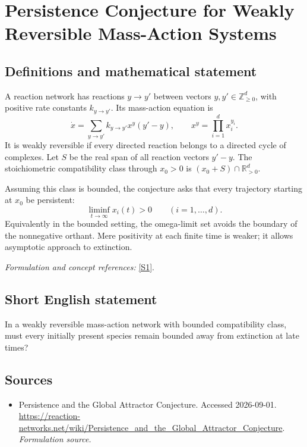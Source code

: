\documentclass[11pt]{article}
\begin{document}
\section*{\texorpdfstring{Persistence Conjecture for Weakly Reversible Mass-Action Systems}{Persistence Conjecture for Weakly Reversible Mass-Action Systems}}\label{30006961}
\subsection{Definitions and mathematical statement}
A reaction network has reactions $y\to y'$ between vectors $y,y'\in{\mathbb{Z}}_{\ge0}^d$, with positive rate constants $k_{y\to y'}$. Its mass-action equation is
\[
 \dot x=\sum_{y\to y'}k_{y\to y'}x^y(y'-y),
 \qquad x^y=\prod_{i=1}^dx_i^{y_i}.
\]
It is weakly reversible if every directed reaction belongs to a directed cycle of complexes. Let $S$ be the real span of all reaction vectors $y'-y$. The stoichiometric compatibility class through $x_0>0$ is $(x_0+S)\cap{\mathbb{R}}_{>0}^d$.

Assuming this class is bounded, the conjecture asks that every trajectory starting at $x_0$ be persistent:
\[
 \liminf_{t\to\infty}x_i(t)>0\qquad(i=1,\ldots,d).
\]
Equivalently in the bounded setting, the omega-limit set avoids the boundary of the nonnegative orthant. Mere positivity at each finite time is weaker; it allows asymptotic approach to extinction.
\par\smallskip\textit{Formulation and concept references:} \href{https://reaction-networks.net/wiki/Persistence_and_the_Global_Attractor_Conjecture}{[S1]}.

\subsection{Short English statement}
In a weakly reversible mass-action network with bounded compatibility class, must every initially present species remain bounded away from extinction at late times?
\subsection{Sources}
\begin{itemize}
\item[S1]Persistence and the Global Attractor Conjecture. Accessed 2026-09-01.
\url{https://reaction-networks.net/wiki/Persistence_and_the_Global_Attractor_Conjecture}.
\textit{Formulation source.}
\end{itemize}
\end{document}
